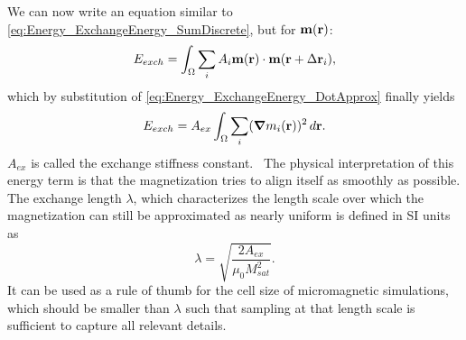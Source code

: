 \documentclass[12pt,a4paper]{article}
\begin{document}
We can now write an equation similar to \cref{eq:Energy_ExchangeEnergy_SumDiscrete}, but for $\vb{m}(\vb{r})$:
\begin{equation*}
    E_{exch} = \int_\Omega \sum_i A_i \vb{m}(\vb{r}) \cdot \vb{m}(\vb{r} + \Delta\vb{r}_i) \mathrm{,}
\end{equation*}
which by substitution of \cref{eq:Energy_ExchangeEnergy_DotApprox} finally yields~\cite{abert2013discrete,Gilbert1956}
\begin{equation}
    E_{exch} = A_{ex} \int_\Omega \sum_i (\gradient{m_i}(\vb{r}))^2 \, d\vb{r} \mathrm{.} \label{eq:Energy_Term_Exchange}
\end{equation}
$A_{ex}$ is called the exchange stiffness constant.~\cite{Gilbert1956} The physical interpretation of this energy term is that the magnetization tries to align itself as smoothly as possible.
The exchange length $\lambda$, which characterizes the length scale over which the magnetization can still be approximated as nearly uniform is defined in SI units \cite{ExchangeLength, ExchangeLength_original, MuMax3} as
\begin{equation}
    \lambda = \sqrt{\frac{2 A_{ex}}{\mu_0 M_{sat}^2}} \mathrm{.}
    \label{eq:Energy_ExchangeEnergy_ExchangeLength}
\end{equation}
It can be used as a rule of thumb for the cell size of micromagnetic simulations, which should be smaller than $\lambda$ such that sampling at that length scale is sufficient to capture all relevant details.~\cite{ExchangeLength}
\end{document}
